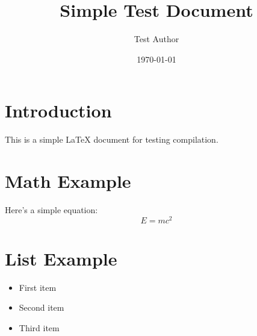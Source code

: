 \documentclass{article}
\title{Simple Test Document}
\author{Test Author}
\date{\today}
\begin{document}
\maketitle

\section{Introduction}
This is a simple LaTeX document for testing compilation.

\section{Math Example}
Here's a simple equation:
\begin{equation}
    E = mc^2
\end{equation}

\section{List Example}
\begin{itemize}
    \item First item
    \item Second item
    \item Third item
\end{itemize}
\end{document}
